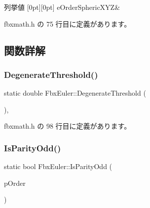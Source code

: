 \begin{DoxyEnumFields}{列挙値}
[0pt][0pt]{}\mbox{\label{class_fbx_euler_a7d5bec7eedb022b4dae56894ab7a9939abd5ec15c7fb9f6e05192fdf4ca8e487f}} 
e\+Order\+Spheric\+X\+YZ&\\
\hline

\end{DoxyEnumFields}


 fbxmath.\+h の 75 行目に定義があります。



\subsection{関数詳解}
\mbox{\label{class_fbx_euler_a4bc8faf22d9ab4ee1d6b45d3ab45d86a}} 
\subsubsection{\texorpdfstring{Degenerate\+Threshold()}{DegenerateThreshold()}}
{\footnotesize\ttfamily static double Fbx\+Euler\+::\+Degenerate\+Threshold (\begin{DoxyParamCaption}{ }\end{DoxyParamCaption})\hspace{0.3cm}{\ttfamily [inline]}, {\ttfamily [static]}}



 fbxmath.\+h の 98 行目に定義があります。

\mbox{\label{class_fbx_euler_a7eabb69ba7eadc7b0b025eccee605648}} 
\subsubsection{\texorpdfstring{Is\+Parity\+Odd()}{IsParityOdd()}}
{\footnotesize\ttfamily static bool Fbx\+Euler\+::\+Is\+Parity\+Odd (\begin{DoxyParamCaption}\item[{\hyperlink{class_fbx_euler_a7d5bec7eedb022b4dae56894ab7a9939}{E\+Order}}]{p\+Order }\end{DoxyParamCaption})\hspace{0.3cm}{\ttfamily [static]}}

